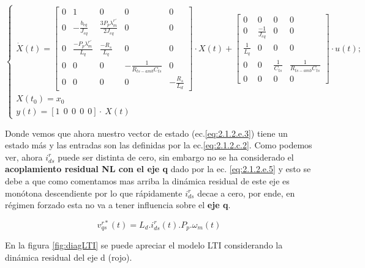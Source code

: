 \documentclass[10pt]{article}
\begin{document}
\begin{enumerate}
\begin{itemize}
	\begin{equation}
	\begin{cases}
	\dot{X}(t)=\begin{bmatrix}
	0 & 1 &0 &0&0\\ 
	0 & -\frac{b_{eq}}{J_{eq}} & \frac{3 P_{p} \lambda^{r'}_{m}}{2 J_{eq}} & 0&0\\ 
	0  & \frac{- P_{p} \lambda^{r'}_{m}}{ L_{q}} & \frac{-R_{s}}{L_{q}} & 0&0\\
	0 & 0 & 0 & -\frac{1}{R_{ts-amb} C_{ts}}&0\\
	0&0&0&0&-\frac{R_{s}}{L_{d}}
	\end{bmatrix}\cdot X(t) + \begin{bmatrix}
	0 &0 &0 &0\\ 
	0 &\frac{-1}{J_{eq}} &0 &0\\ 
	 \frac{1}{L_{q}}&0 &0 & 0\\
	0 & 0 & \frac{1}{C_{ts}} & \frac{1}{R_{ts-amb} C_{ts}}\\
	0 &0 &0 &0
	\end{bmatrix} 
	\cdot u(t); \\
	X(t_{0})=x_{0}\\ 
	y(t)=[1 \ \ 0 \ \ 0 \ \ 0 \ \ 0]\cdot \ X(t)
	\end{cases}
	\label{eq:2.1.2.e.4}
	\end{equation}
	

	

	Donde vemos que ahora nuestro vector de estado (ec.\ref{eq:2.1.2.e.3}) tiene un estado más y las entradas son las definidas por la ec.\ref{eq:2.1.2.c.2}. Como podemos ver, ahora $i^{r}_{ds}$ puede ser distinta de cero, sin embargo no se ha considerado el \textbf{acoplamiento residual NL con el eje q} dado por la ec. \ref{eq:2.1.2.e.5} y esto se debe a que como comentamos mas arriba la dinámica residual de este eje es monótona descendiente por lo que rápidamente $i^{r}_{ds}$ decae a cero, por ende, en régimen forzado esta no va a tener influencia sobre el \textbf{eje q}.
	
	\begin{equation}
	v^{r*}_{qs}(t)=L_{d}. i^{r}_{ds}(t).P_{p}.\omega_{m}(t)
	\label{eq:2.1.2.e.5}
	\end{equation}
	
	En la figura \ref{fig:diagLTI} se puede apreciar el modelo LTI considerando la dinámica residual del eje d (rojo).
	

\end{itemize}
\end{enumerate}
\end{document}

